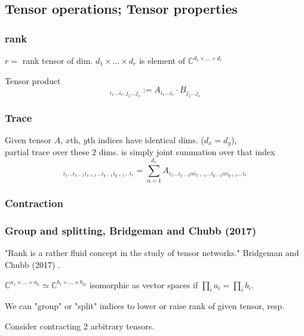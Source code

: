 \subsection{Tensor operations; Tensor properties}

\subsubsection{rank}

$r=$ rank tensor of dim. $d_1\times \dots \times d_r$ is element of $\mathbb{C}^{d_1\times \dots \times d_r}$  

Tensor product
\begin{equation}
	[A \otimes B]_{i_1 \dots i_r, j_1 \dots j_s } := A_{i_1 \dots i_r} \cdot B_{j_1 \dots j_s }
\end{equation}

\subsubsection{Trace}
Given tensor $A$, $x$th, $y$th indices have identical dims. ($d_x = d_y$), \\
partial trace over these 2 dims. is simply joint summation over that index
\begin{equation}
	[\text{Tr}_{x,y} A]_{i_1\dots i_{x-1}i_{x+1} \dots i_{y-1}i_{y+1} \dots i_r} = \sum_{\alpha=1}^{d_x} A_{i_1 \dots i_{x-1} \alpha i_{x+1} \dots i_{y-1} \alpha i_{y+1} \dots i_r}
\end{equation}

\subsubsection{Contraction}

\subsubsection{Group and splitting, Bridgeman and Chubb (2017) \cite{agat:BrCh2017} }

"Rank is a rather fluid concept in the study of tensor networks."  Bridgeman and Chubb (2017) \cite{agat:BrCh2017}.  

$\mathbb{C}^{a_1 \times \dots \times a_n} \simeq \mathbb{C}^{b_1 \times \dots \times b_m}$ isomorphic as vector spaces if $\prod_i a_i = \prod_i b_i$.  

We can "group" or "split" indices to lower or raise rank of given tensor, resp.  

Consider contracting 2 arbitrary tensors.  

